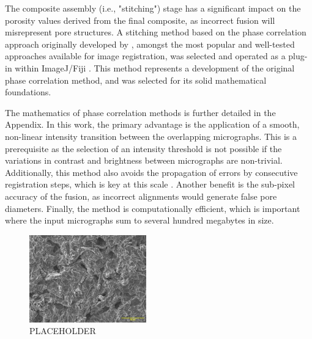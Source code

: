 \documentclass[3p,twocolumn]{elsarticle}
\begin{document}
The composite assembly (i.e., "stitching") stage has a significant impact on
the porosity values derived from the final composite, as incorrect fusion will
misrepresent pore structures. A stitching method based on the phase correlation
approach originally developed by \citet{Kuglin1975}, amongst the most popular
and well-tested approaches available for image registration, was selected and
operated as a plug-in within ImageJ/Fiji \citep{Preibisch2009}. This method
represents a development of the original phase correlation method, and was
selected for its solid mathematical foundations\citep{Preibisch2009}.
	
	The mathematics of phase correlation methods is further detailed in the
	Appendix. In this work, the primary advantage is the application of a
	smooth, non-linear intensity transition between the overlapping micrographs.
	This is a prerequisite as the selection of an intensity threshold is not
	possible if the variations in contrast and brightness between micrographs
	are non-trivial. Additionally, this method also avoids the propagation of
	errors by consecutive registration steps, which is key at this scale
	\citep{Preibisch2009}. Another benefit is the sub-pixel accuracy of the
	fusion, as incorrect alignments would generate false pore diameters.
	Finally, the method is computationally efficient, which is important where
	the input micrographs sum to several hundred megabytes in size.



\begin{table}[ht]
  \centering
  \caption{Parameters for composite assembly captured with the JEOL IT510 SEM using Image Montage Mode}
  \label{tab:microscopy_parameters}
\end{table}

\begin{figure}[ht]
    \includegraphics[width=0.45\textwidth]{./Media/image.png}
    \caption{PLACEHOLDER}
    \label{fig:testimage1}
\end{figure}
\clearpage

\end{document}
